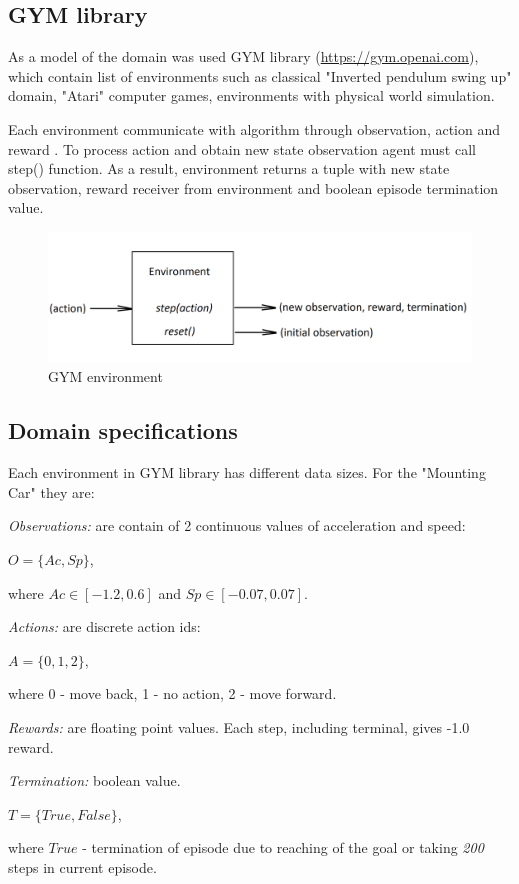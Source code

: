 \documentclass[12pt]{article}
\begin{document}
\subsection{GYM library}{
As a model of the domain was used GYM library (\url{https://gym.openai.com}), which contain list of environments such as classical "Inverted pendulum swing up" domain, "Atari" computer games, environments with physical world simulation.\par
Each environment communicate with algorithm through observation, action and reward . To process action and obtain new state observation agent must call step() function. As a result, environment returns a tuple with new state observation, reward receiver from environment and boolean episode termination value.
\begin{figure}[h!]
\begin{center}
\includegraphics[scale=0.5]{images/gym_env.png}
\end{center}
\caption{GYM environment}
\label{gym_env}
\end{figure}
}
\subsection{Domain specifications}
\label{subsec:spec}{
Each environment in GYM library has different data sizes. For the "Mounting Car" they are:\par
\textit{Observations:} are contain of 2 continuous values of acceleration and speed:
\begin{center}
$O=\{Ac, Sp\}$,
\end{center}
where $Ac \in [-1.2, 0.6]$ and $Sp \in [-0.07, 0.07]$.\par
\textit{Actions:} are discrete action ids:
\begin{center}
$A=\{0, 1, 2\}$,
\end{center}
where 0 - move back, 1 - no action, 2 - move forward.\par
\textit{Rewards:} are floating point values. Each step, including terminal, gives -1.0 reward.\par
\textit{Termination:} boolean value.
\begin{center}
$T=\{True, False\}$,
\end{center}
where $True$ - termination of episode due to reaching of the goal or taking \textit{200} steps in current episode.\par
}
\end{document}

